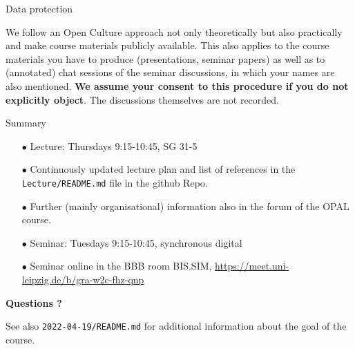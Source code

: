 \documentclass{beamer}
\begin{document}
\begin{frame}{Data protection}

We follow an Open Culture approach not only theoretically but also practically
and make course materials publicly available. This also applies to the course
materials you have to produce (presentations, seminar papers) as well as to
(annotated) chat sessions of the seminar discussions, in which your names are
also mentioned. \textbf{We assume your consent to this procedure if you do not
  explicitly object}. The discussions themselves are not recorded.

\end{frame}

\begin{frame}{Summary}

\begin{itemize}
\item[$\bullet$] Lecture: Thursdays 9:15-10:45, SG 31-5
\item[$\bullet$] Continuously updated lecture plan and list of references in
  the \texttt{Lecture/README.md} file in the github Repo.  
\item[$\bullet$] Further (mainly organisational) information also in the forum
  of the OPAL course.
\item[$\bullet$] Seminar: Tuesdays 9:15-10:45, synchronous digital
\item[$\bullet$] Seminar online in the BBB room BIS.SIM,
  \url{https://meet.uni-leipzig.de/b/gra-w2c-fhz-qnp}
\end{itemize}
\begin{center}\LARGE\bf
  Questions ?
\end{center}

See also \texttt{2022-04-19/README.md} for additional information about the
goal of the course. 

\end{frame}
\end{document}
